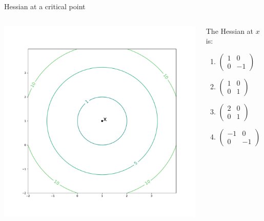 \documentclass{beamer}
\begin{document}
\begin{frame}[t]{Hessian at a critical point}

	\vspace{-1.6cm}
	\begin{columns}
		\begin{column}{0.7\textwidth}
			\hspace*{-1.7cm}
			\includegraphics[width=11.0cm]{contour_min1.pdf}
		\end{column}
		\hspace*{0.2cm}
		\begin{column}{0.29\textwidth}
			The Hessian at $x$ is:
			\begin{enumerate}
				\item $\displaystyle
					\begin{pmatrix}
						1 & 0 \\
						0 & -1
					\end{pmatrix}$
				\item $\displaystyle
					\begin{pmatrix}
						1 & 0 \\
						0 & 1
					\end{pmatrix}$
				\item $\displaystyle
					\begin{pmatrix}
						2 & 0 \\
						0 & 1
					\end{pmatrix}$
				\item $\displaystyle
					\begin{pmatrix}
						-1 & 0 \\
						0 & -1
					\end{pmatrix}$
			\end{enumerate}
		\end{column}
	\end{columns}

\end{frame}
\end{document}
